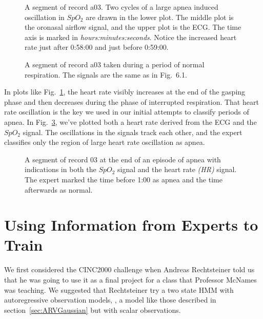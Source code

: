 \begin{figure}
  \caption[A segment of record a03]%
  {A segment of record a03.  Two cycles of a large apnea induced
    oscillation in $SpO_2$ are drawn in the lower plot.  The middle
    plot is the oronasal airflow signal, and the upper plot is the
    ECG.  The time axis is marked in \emph{hours:minutes:seconds}.
    Notice the increased heart rate just after 0:58:00 and just before
    0:59:00.}
  \label{fig:a03erA}
\end{figure}

\begin{figure}
  \caption[A segment of record a03]%
  {A segment of record a03 taken during a period of normal
    respiration.  The signals are the same as in Fig.~6.1.}
  \label{fig:a03erN}
\end{figure}

In plots like Fig.~\ref{fig:a03erA}, the heart rate visibly increases
at the end of the gasping phase and then decreases during the phase of
interrupted respiration.  That heart rate oscillation is the key we
used in our initial attempts to classify periods of apnea.  In
Fig.~\ref{fig:a03erHR}, we've plotted both a heart rate derived from
the ECG  and the $SpO_2$
signal.  The oscillations in the signals track each other, and the
expert classifies only the region of large heart rate oscillation as
apnea.
\begin{figure}
  \caption[A segment of record 03 at the end of an episode of apnea]%
  {A segment of record 03 at the end of an episode of apnea with
    indications in both the $SpO_2$ signal and the heart rate
    \emph{(HR)} signal.  The expert marked the time before 1:00 as
    apnea and the time afterwards as normal.}
  \label{fig:a03erHR}
\end{figure}

\section{Using Information from Experts to Train}

We first considered the CINC2000 challenge when Andreas Rechtsteiner
told us that he was going to use it as a final project for a class
that Professor McNames was teaching.  We suggested that Rechtsteiner
try a two state HMM with autoregressive observation models, \ie, a
model like those described in section~\ref{sec:ARVGaussian} but with
scalar observations.

